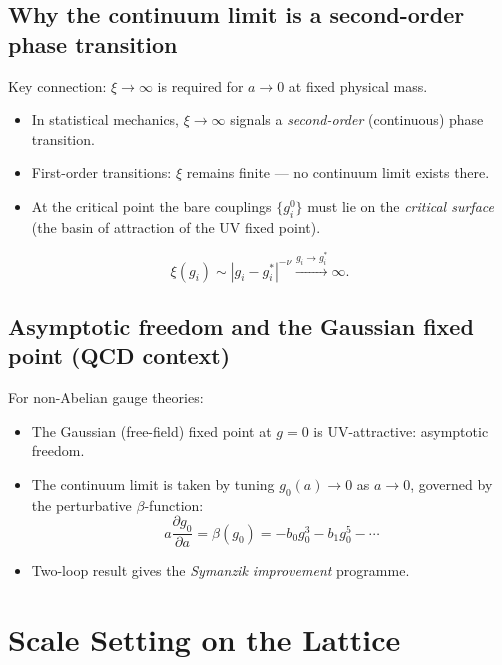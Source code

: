 \documentclass[11pt]{article}
\theoremstyle{definition}
\begin{document}
\subsection{Why the continuum limit is a second-order phase transition}

Key connection: $\xi \to \infty$ is required for $a \to 0$ at fixed physical mass.

\begin{itemize}
    \item In statistical mechanics, $\xi \to \infty$ signals a \emph{second-order} (continuous) phase transition.
    \item First-order transitions: $\xi$ remains finite --- no continuum limit exists there.
    \item At the critical point the bare couplings $\{g_i^0\}$ must lie on the \emph{critical surface}
          (the basin of attraction of the UV fixed point).
\end{itemize}

\begin{equation}
    \xi(g_i) \sim |g_i - g_i^*|^{-\nu} \xrightarrow{g_i \to g_i^*} \infty.
\end{equation}

\subsection{Asymptotic freedom and the Gaussian fixed point (QCD context)}

For non-Abelian gauge theories:
\begin{itemize}
    \item The Gaussian (free-field) fixed point at $g=0$ is UV-attractive: asymptotic freedom.
    \item The continuum limit is taken by tuning $g_0(a) \to 0$ as $a\to 0$, governed by the
          perturbative $\beta$-function:
          \begin{equation}
              a\frac{\partial g_0}{\partial a} = \beta(g_0) = -b_0 g_0^3 - b_1 g_0^5 - \cdots
          \end{equation}
    \item Two-loop result gives the \emph{Symanzik improvement} programme.
\end{itemize}

\section{Scale Setting on the Lattice}
\end{document}
